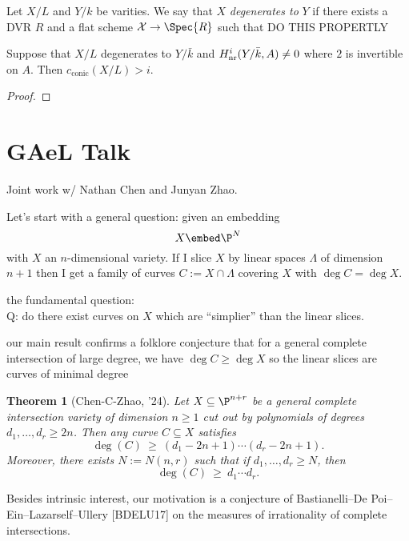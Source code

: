 \documentclass[12pt]{article}
\theoremstyle{plain}
\newtheorem{Lthm}{Theorem}
\begin{document}
\begin{defn}
Let $X / L$ and $Y / k$ be varities. We say that $X$ \textit{degenerates to} $Y$ if there exists a DVR $R$ and a flat scheme $\X \to \Spec{R}$ such that {\color{red} DO THIS PROPERTLY} 
\end{defn}

\begin{theorem}
Suppose that $X / L$ degenerates to $Y / \bar{k}$ and $H^i_{\mathrm{nr}}(Y/\bar{k}, A) \neq 0$ where $2$ is invertible on $A$. Then $c_{\text{conic}}(X/L) > i$.
\end{theorem}

\begin{proof}

\end{proof}

\section{GAeL Talk}

Joint work w/ Nathan Chen and Junyan Zhao.

{\color{red} Let's start with a general question: given an embedding}
\[ X \embed \P^N \]
with $X$ an $n$-dimensional variety. If I slice $X$ by linear spaces $\Lambda$ of dimension $n+1$ then I get a family of curves $C := X \cap \Lambda$ covering $X$ with $\deg{C} = \deg{X}$. 

{\color{red} the fundamental question:}
\\
\noindent
Q: do there exist curves on $X$ which are ``simplier'' than the linear slices.

{\color{red} our main result confirms a folklore conjecture that for a general complete intersection of large degree, we have $\deg{C} \ge \deg{X}$ so the linear slices are curves of minimal degree}

\begin{Lthm}[Chen-C-Zhao, '24]
Let $X \subseteq \P^{n+r}$ be a general complete intersection variety of dimension $n \geq 1$ cut out by polynomials of degrees $d_{1}, \ldots, d_{r} \geq 2n$. Then any curve $C \subseteq X$ satisfies
\[ \deg(C)\ \ge\ (d_1 - 2n + 1) \cdots (d_r - 2n + 1) .\]
Moreover, there exists $N := N(n,r)$ such that if $d_1, \dots, d_r \ge N$, then
\[ \deg(C)\ \ge\ d_1 \cdots d_r. \]
\end{Lthm}

{\color{red} Besides intrinsic interest, our motivation is a conjecture of Bastianelli--De Poi--Ein--Lazarself--Ullery [BDELU17] on the measures of irrationality of complete intersections.}
\end{document}
